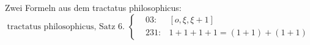 \documentclass{scrartcl}
\begin{document}
Zwei Formeln aus dem tractatus philosophicus:
\begin{equation}
\text{tractatus philosophicus, Satz 6. }
\left\{ %
    \begin{matrix}
       & 03:  & [ o, \xi, \xi + 1] \\
       & 231: & 1 + 1 + 1 + 1 = (1+1) + (1+1)
    \end{matrix}
  \right. %
\end{equation}

\end{document}
